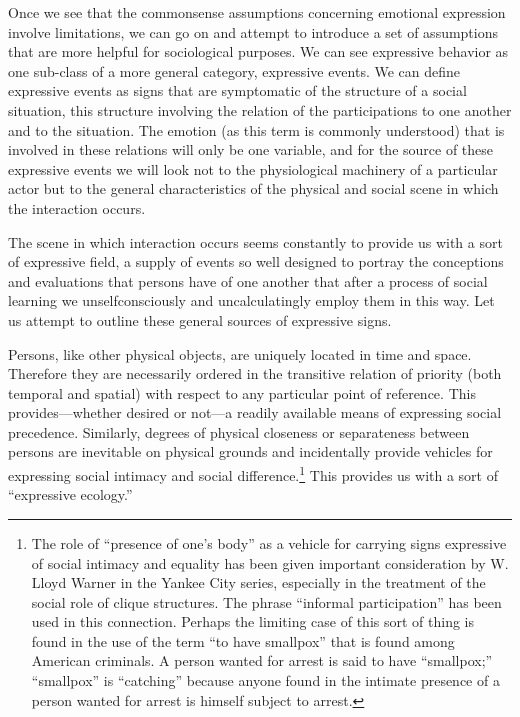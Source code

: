 \documentclass[openany,nobib]{tufte-book}
\begin{document}
\noindent Once we see that the commonsense assumptions concerning emotional
expression involve limitations, we can go on and attempt to introduce a
set of assumptions that are more helpful for sociological purposes. We
can see expressive behavior as one sub-class of a more general category,
expressive events. We can define expressive events as signs that are
symptomatic of the structure of a social situation, this structure
involving the relation of the participations to one another and to the
situation. The emotion (as this term is commonly understood) that is
involved in these relations will only be one variable, and for the
source of these expressive events we will look not to the physiological
machinery of a particular actor but to the general characteristics of
the physical and social scene in which the interaction occurs.

The scene in which interaction occurs seems constantly to provide us
with a sort of expressive field, a supply of events so well designed to
portray the conceptions and evaluations that persons have of one another
that after a process of social learning we unselfconsciously and
uncalculatingly employ them in this way. Let us attempt to outline these
general sources of expressive signs.

Persons, like other physical objects, are uniquely located in time and
space. Therefore they are necessarily ordered in the transitive relation
of priority (both temporal and spatial) with respect to any particular
point of reference. This provides---whether desired or not---a readily
available means of expressing social precedence. Similarly, degrees of
physical closeness or separateness between persons are inevitable on
physical grounds and incidentally provide vehicles for expressing social
intimacy and social difference.\footnote{The role of ``presence of one's
  body'' as a vehicle for carrying signs expressive of social intimacy
  and equality has been given important consideration by W. Lloyd Warner
  in the Yankee City series, especially in the treatment of the social
  role of clique structures. The phrase ``informal participation'' has
  been used in this connection. Perhaps the limiting case of this sort
  of thing is found in the use of the term ``to have smallpox'' that is
  found among American criminals. A person wanted for arrest is said to
  have ``smallpox;'' ``smallpox'' is ``catching'' because anyone found
  in the intimate presence of a person wanted for arrest is himself
  subject to arrest.} This provides us with a sort of ``expressive
ecology.''
\end{document}
